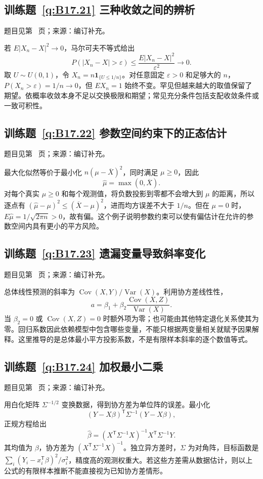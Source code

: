\subsection*{训练题~\ref{q:B17.21} 三种收敛之间的辨析}\label{a:B17.21}{\small 题目见第~\pageref{q:B17.21} 页；来源：编订补充。}
\begin{solve}若 $E|X_n-X|^2\to0$，马尔可夫不等式给出\[P(|X_n-X|>\varepsilon)\le\frac{E|X_n-X|^2}{\varepsilon^2}\to0.\]取 $U\sim U(0,1)$，令 $X_n=n\mathbf1_{\{U\le1/n\}}$。对任意固定 $\varepsilon>0$ 和足够大的 $n$，$P(X_n>\varepsilon)=1/n\to0$，但 $EX_n=1$ 始终不变。罕见但越来越大的取值保留了期望。依概率收敛本身不足以交换极限和期望；常见充分条件包括支配收敛条件或一致可积性。\end{solve}

\subsection*{训练题~\ref{q:B17.22} 参数空间约束下的正态估计}\label{a:B17.22}{\small 题目见第~\pageref{q:B17.22} 页；来源：编订补充。}
\begin{solve}最大化似然等价于最小化 $n(\mu-\overline X)^2$，同时满足 $\mu\ge0$，因此\[\widehat\mu=\max(0,\overline X).\]对每个真实 $\mu\ge0$ 和每个观测值，将负数投影到零都不会增大到 $\mu$ 的距离，所以逐点有 $(\widehat\mu-\mu)^2\le(\overline X-\mu)^2$，进而均方误差不大于 $1/n$。但在 $\mu=0$ 时，$E\widehat\mu=1/\sqrt{2\pi n}>0$，故有偏。这个例子说明参数约束可以使有偏估计在允许的参数空间内具有更小的平方风险。\end{solve}

\subsection*{训练题~\ref{q:B17.23} 遗漏变量导致斜率变化}\label{a:B17.23}{\small 题目见第~\pageref{q:B17.23} 页；来源：编订补充。}
\begin{solve}总体线性预测的斜率为 $\operatorname{Cov}(X,Y)/\operatorname{Var}(X)$。利用协方差线性性，\[a=\beta_1+\beta_2\frac{\operatorname{Cov}(X,Z)}{\operatorname{Var}(X)}.\]当 $\beta_2=0$ 或 $\operatorname{Cov}(X,Z)=0$ 时额外项为零；也可能由其他特定退化关系使其为零。回归系数因此依赖模型中包含哪些变量，不能只根据两变量相关就赋予因果解释。这里推导的是总体最小平方投影系数，不是有限样本斜率的逐个数值等式。\end{solve}

\subsection*{训练题~\ref{q:B17.24} 加权最小二乘}\label{a:B17.24}{\small 题目见第~\pageref{q:B17.24} 页；来源：编订补充。}
\begin{solve}用白化矩阵 $\Sigma^{-1/2}$ 变换数据，得到协方差为单位阵的误差。最小化\[(Y-X\beta)^\mathsf T\Sigma^{-1}(Y-X\beta),\]正规方程给出\[\widehat\beta=(X^\mathsf T\Sigma^{-1}X)^{-1}X^\mathsf T\Sigma^{-1}Y.\]其均值为 $\beta$，协方差为 $(X^\mathsf T\Sigma^{-1}X)^{-1}$。独立异方差时，$\Sigma$ 为对角阵，目标函数是 $\sum_i(Y_i-x_i^\mathsf T\beta)^2/\sigma_i^2$，精度高的观测权重大。若这些方差需从数据估计，则以上公式的有限样本推断不能直接视为已知协方差情形。\end{solve}

\clearpage




